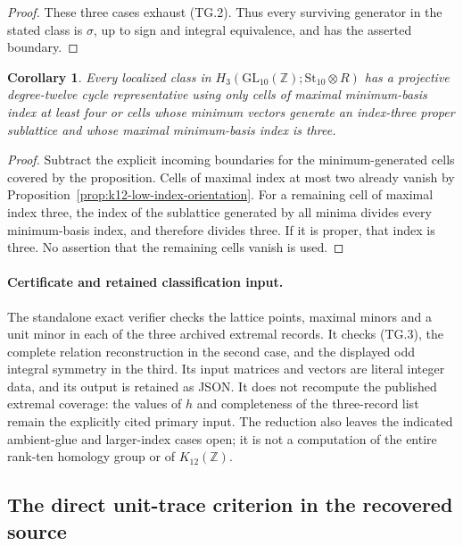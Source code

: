 \documentclass[11pt,a4paper]{article}
\newtheorem{corollary}[theorem]{Corollary}
\theoremstyle{definition}
\begin{document}
\begin{proof}
These three cases exhaust (TG.2). Thus every surviving generator
in the stated class is $\sigma$, up to sign and integral
equivalence, and has the asserted boundary.
\end{proof}

\begin{corollary}
Every localized class in
$H_3(\mathrm{GL}_{10}(\mathbb Z);\mathrm{St}_{10}\otimes R)$
has a projective degree-twelve cycle representative using only
cells of maximal minimum-basis index at least four or cells
whose minimum vectors generate an index-three proper sublattice
and whose maximal minimum-basis index is three.
\end{corollary}

\begin{proof}
Subtract the explicit incoming boundaries for the
minimum-generated cells covered by the proposition. Cells of
maximal index at most two already vanish by
Proposition~\ref{prop:k12-low-index-orientation}. For a remaining
cell of maximal index three, the index of the sublattice generated
by all minima divides every minimum-basis index, and therefore
divides three. If it is proper, that index is three. No assertion
that the remaining cells vanish is used.
\end{proof}

\paragraph{Certificate and retained classification input.}
The standalone exact verifier
checks the lattice points, maximal minors and a unit minor in
each of the three archived extremal records. It checks (TG.3),
the complete relation reconstruction in the second case, and
the displayed odd integral symmetry in the third. Its input
matrices and vectors are literal integer data, and its output
is retained as JSON. It does not recompute the published
extremal coverage: the values of $h$ and completeness of the
three-record list remain the explicitly cited primary input.
The reduction also leaves the indicated ambient-glue and
larger-index cases open; it is not a computation of the entire
rank-ten homology group or of $K_{12}(\mathbb Z)$.

\subsection{The direct unit-trace criterion in the recovered source}
\label{sec:step17-unit-interface}
\end{document}
